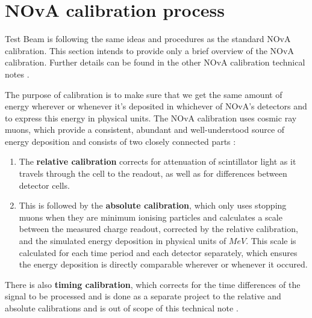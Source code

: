 \documentclass[12pt,a4paper]{article}
\begin{document}

\section{NOvA calibration process}
Test Beam is following the same ideas and procedures as the standard NOvA calibration. This section intends to provide only a brief overview of the NOvA calibration. Further details can be found in the other NOvA calibration technical notes \cite{NOVA-doc-13579}.

The purpose of calibration is to make sure that we get the same amount of energy wherever or whenever it's deposited in whichever of NOvA's detectors and to express this energy in physical units. The NOvA calibration uses cosmic ray muons, which provide a consistent, abundant and well-understood source of energy deposition and consists of two closely connected parts \cite{NOVA-doc-7410}:
\begin{enumerate}
\item The \textbf{relative calibration} corrects for attenuation of scintillator light as it travels through the cell to the readout, as well as for differences between detector cells.
\item This is followed by the \textbf{absolute calibration}, which only uses stopping muons when they are minimum ionising particles and calculates a scale between the measured charge readout, corrected by the relative calibration, and the simulated energy deposition in physical units of $\unit{MeV}$. This scale is calculated for each time period and each detector separately, which ensures the energy deposition is directly comparable wherever or whenever it occured.
\end{enumerate}

There is also \textbf{timing calibration}, which corrects for the time differences of the signal to be processed and is done as a separate project to the relative and absolute calibrations and is out of scope of this technical note \cite{NinerThesis}.
\end{document}
